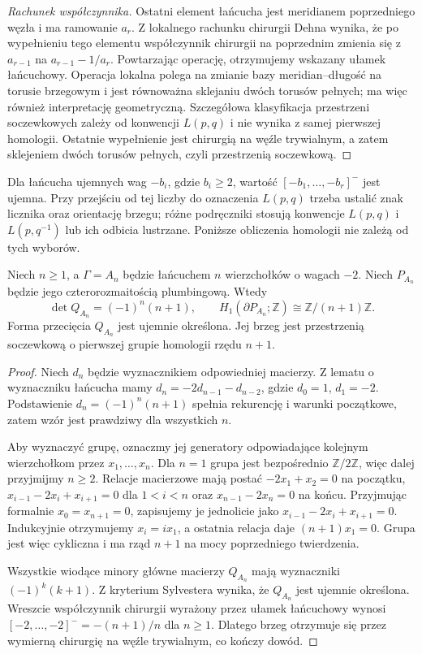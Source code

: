 \begin{proof}[Rachunek współczynnika]
Ostatni element łańcucha jest meridianem poprzedniego
węzła i ma ramowanie $a_r$. Z lokalnego rachunku chirurgii
Dehna wynika, że po wypełnieniu tego elementu
współczynnik chirurgii na poprzednim zmienia się z
$a_{r-1}$ na $a_{r-1}-1/a_r$. Powtarzając operację,
otrzymujemy wskazany ułamek łańcuchowy. Operacja lokalna
polega na zmianie bazy meridian--długość na torusie
brzegowym i jest równoważna sklejaniu dwóch torusów
pełnych; ma więc również interpretację geometryczną.
Szczegółowa klasyfikacja przestrzeni soczewkowych
zależy od konwencji $L(p,q)$ i nie wynika z samej
pierwszej homologii. Ostatnie wypełnienie jest chirurgią
na węźle trywialnym, a zatem sklejeniem dwóch torusów
pełnych, czyli przestrzenią soczewkową.
\end{proof}

\begin{uwaga}
Dla łańcucha ujemnych wag $-b_i$, gdzie $b_i\ge2$,
wartość $[-b_1,\dots,-b_r]^-$ jest ujemna.
Przy przejściu od tej liczby do oznaczenia $L(p,q)$
trzeba ustalić znak licznika oraz orientację brzegu;
różne podręczniki stosują konwencje $L(p,q)$ i
$L(p,q^{-1})$ lub ich odbicia lustrzane.
Poniższe obliczenia homologii nie zależą od tych wyborów.
\end{uwaga}

\begin{twierdzenie}
\label{thm:tg-plumbing-An}
Niech $n\ge1$, a $\Gamma=A_n$ będzie łańcuchem
$n$ wierzchołków o wagach $-2$. Niech $P_{A_n}$
będzie jego czterorozmaitością plumbingową. Wtedy
\[
\det Q_{A_n}=(-1)^n(n+1),\qquad
H_1(\partial P_{A_n};\mathbb Z)\cong\mathbb Z/(n+1)\mathbb Z.
\]
Forma przecięcia $Q_{A_n}$ jest ujemnie określona.
Jej brzeg jest przestrzenią soczewkową o pierwszej
grupie homologii rzędu $n+1$.
\end{twierdzenie}
\begin{proof}
Niech $d_n$ będzie wyznacznikiem odpowiedniej macierzy.
Z lematu o wyznaczniku łańcucha mamy
$d_n=-2d_{n-1}-d_{n-2}$, gdzie $d_0=1$, $d_1=-2$.
Podstawienie $d_n=(-1)^n(n+1)$ spełnia rekurencję
i warunki początkowe, zatem wzór jest prawdziwy dla
wszystkich $n$.

Aby wyznaczyć grupę, oznaczmy jej generatory odpowiadające
kolejnym wierzchołkom przez $x_1,\dots,x_n$. Dla $n=1$ grupa jest bezpośrednio
$\mathbb Z/2\mathbb Z$, więc dalej przyjmijmy $n\ge2$.
Relacje
macierzowe mają postać
$-2x_1+x_2=0$ na początku,
$x_{i-1}-2x_i+x_{i+1}=0$ dla $1<i<n$ oraz
$x_{n-1}-2x_n=0$ na końcu.
Przyjmując formalnie $x_0=x_{n+1}=0$, zapisujemy je
jednolicie jako $x_{i-1}-2x_i+x_{i+1}=0$.
Indukcyjnie otrzymujemy $x_i=i x_1$, a ostatnia relacja
daje $(n+1)x_1=0$. Grupa jest więc cykliczna i ma
rząd $n+1$ na mocy poprzedniego twierdzenia.

Wszystkie wiodące minory główne macierzy $Q_{A_n}$
mają wyznaczniki $(-1)^k(k+1)$. Z kryterium Sylvestera
wynika, że $Q_{A_n}$ jest ujemnie określona.
Wreszcie współczynnik chirurgii wyrażony przez ułamek
łańcuchowy wynosi
$[-2,\dots,-2]^-=-(n+1)/n$ dla $n\ge1$.
Dlatego brzeg otrzymuje się przez wymierną chirurgię
na węźle trywialnym, co kończy dowód.
\end{proof}

